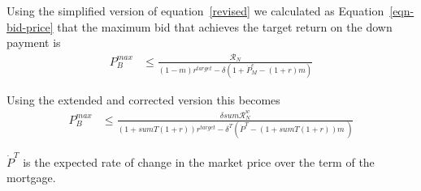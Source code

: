 Using the simplified version of equation~\ref{revised} we  calculated  as Equation~\ref{eqn-bid-price} that the maximum bid that achieves the target return on the down payment is
\begin{align*}
P_B^{max} & \le    \frac{\mathcal{R}_N}{(1-m)r^{target}-\delta \left(1 + \dot P_M^e - (1+r)m\right)}  \end{align*}

Using the extended and corrected version this becomes
\begin{align}
P_B^{max} & \le    \frac{\delta sum\mathcal{R}^w_N } {(1 + sumT(1+r))r^{target}-\delta^T \left(\dot P^T - (1 + sumT(1+r))m\ \right)} \label{eqn-bid-revised} \end{align}

$\dot P^T$  is the expected rate of change in the market price over the term of the mortgage.